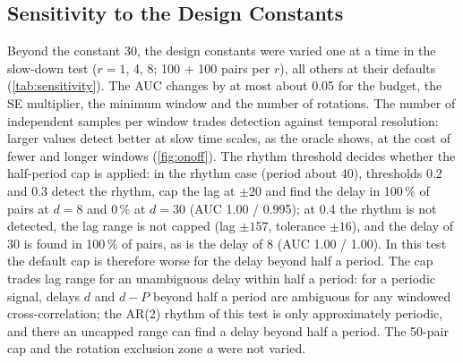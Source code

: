 \documentclass[11pt,a4paper]{article}
\begin{document}
\subsection{Sensitivity to the Design Constants}
\label{app:sens}
Beyond the constant 30, the design constants were varied one at a time in the slow-down test ($r = 1$, 4, 8; 100 + 100 pairs per $r$), all others at their defaults (\cref{tab:sensitivity}). The AUC changes by at most about 0.05 for the budget, the SE multiplier, the minimum window and the number of rotations. The number of independent samples per window trades detection against temporal resolution: larger values detect better at slow time scales, as the oracle shows, at the cost of fewer and longer windows (\cref{fig:onoff}). The rhythm threshold decides whether the half-period cap is applied: in the rhythm case (period about 40), thresholds 0.2 and 0.3 detect the rhythm, cap the lag at $\pm20$ and find the delay in 100\,\% of pairs at $d = 8$ and 0\,\% at $d = 30$ (AUC 1.00 / 0.995); at 0.4 the rhythm is not detected, the lag range is not capped (lag $\pm157$, tolerance $\pm16$), and the delay of 30 is found in 100\,\% of pairs, as is the delay of 8 (AUC 1.00 / 1.00). In this test the default cap is therefore worse for the delay beyond half a period. The cap trades lag range for an unambiguous delay within half a period: for a periodic signal, delays $d$ and $d - P$ beyond half a period are ambiguous for any windowed cross-correlation; the AR(2) rhythm of this test is only approximately periodic, and there an uncapped range can find a delay beyond half a period. The 50-pair cap and the rotation exclusion zone $a$ were not varied.
\end{document}
